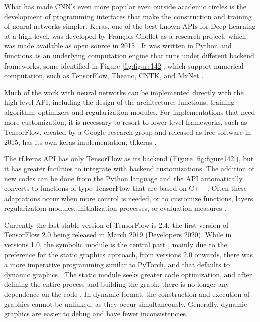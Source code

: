 What has made CNN's even more popular even outside academic circles is the development of programming interfaces that make the construction and training of neural networks simpler. Keras, one of the best known APIs for Deep Learning  at a high level, was developed by François Chollet as a research project, which was made available as open source in 2015 \cite{geron2019}. It was written in Python and functions as an underlying computation engine that runs under different backend frameworks, some identified in Figure \ref{fig:figure142}, which support numerical computation, such as TensorFlow, Theano, CNTK, and MxNet \cite{geron2019}.

Much of the work with neural networks can be implemented directly with the high-level API, including the design of the architecture, functions, training algorithm, optimizers and regularization modules. For implementations that need more customization, it is necessary to resort to lower level frameworks, such as TensorFlow, created by a Google research group and released as free software in 2015, has its own keras implementation, tf.keras \cite{geron2019}.

The tf.keras API has only TensorFlow as its backend (Figure \ref{fig:figure142}), but it has greater facilities to integrate with backend customizations. The addition of new codes can be done from the Python language and the API automatically converts to functions of type TensorFlow that are based on C++ \cite{geron2019}. Often these adaptations occur when more control is needed, or to customize functions, layers, regularization modules, initialization processes, or evaluation measures \cite{geron2019}.

Currently the last stable version of TensorFlow is 2.4, the first version of TensorFlow 2.0 being released in March 2019 (Developers 2020). While in versions 1.0, the symbolic module is the central part \cite{geron2019}, mainly due to the preference for the static graphics approach, from versions 2.0 onwards, there was a more imperative programming similar to PyTorch, and that defaults to dynamic graphics \cite{zhang2020dive}. The static module seeks greater code optimization, and after defining the entire process and building the graph, there is no longer any dependence on the code \cite{johnson2019}. In dynamic format, the construction and execution of graphics cannot be unlinked, as they occur simultaneously. Generally, dynamic graphics are easier to debug and have fewer inconsistencies.

